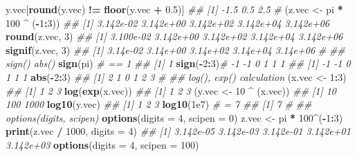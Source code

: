 \documentclass[
]{book}
\newenvironment{Shaded}{\begin{snugshade}}{\end{snugshade}}
\newcommand{\CommentTok}[1]{\textcolor[rgb]{0.56,0.35,0.01}{\textit{#1}}}
\newcommand{\DataTypeTok}[1]{\textcolor[rgb]{0.13,0.29,0.53}{#1}}
\newcommand{\DecValTok}[1]{\textcolor[rgb]{0.00,0.00,0.81}{#1}}
\newcommand{\FloatTok}[1]{\textcolor[rgb]{0.00,0.00,0.81}{#1}}
\newcommand{\KeywordTok}[1]{\textcolor[rgb]{0.13,0.29,0.53}{\textbf{#1}}}
\newcommand{\NormalTok}[1]{#1}
\newcommand{\OperatorTok}[1]{\textcolor[rgb]{0.81,0.36,0.00}{\textbf{#1}}}
\newcommand{\StringTok}[1]{\textcolor[rgb]{0.31,0.60,0.02}{#1}}
\begin{document}
\begin{Shaded}
\begin{Highlighting}[]
\NormalTok{y.vec[}\KeywordTok{round}\NormalTok{(y.vec) }\OperatorTok{!=}\StringTok{ }\KeywordTok{floor}\NormalTok{(y.vec }\OperatorTok{+}\StringTok{ }\FloatTok{0.5}\NormalTok{)]}
\CommentTok{\#\# [1] {-}1.5  0.5  2.5}
\CommentTok{\#}
\NormalTok{(z.vec \textless{}{-}}\StringTok{ }\NormalTok{pi }\OperatorTok{*}\StringTok{ }\DecValTok{100} \OperatorTok{\^{}}\StringTok{ }\NormalTok{(}\OperatorTok{{-}}\DecValTok{1}\OperatorTok{:}\DecValTok{3}\NormalTok{))}
\CommentTok{\#\# [1] 3.142e{-}02 3.142e+00 3.142e+02 3.142e+04 3.142e+06}
\KeywordTok{round}\NormalTok{(z.vec, }\DecValTok{3}\NormalTok{)}
\CommentTok{\#\# [1] 3.100e{-}02 3.142e+00 3.142e+02 3.142e+04 3.142e+06}
\KeywordTok{signif}\NormalTok{(z.vec, }\DecValTok{3}\NormalTok{)}
\CommentTok{\#\# [1] 3.14e{-}02 3.14e+00 3.14e+02 3.14e+04 3.14e+06}
\CommentTok{\#}
\CommentTok{\#\# sign() abs()}
\KeywordTok{sign}\NormalTok{(pi) }\CommentTok{\# == 1}
\CommentTok{\#\# [1] 1}
\KeywordTok{sign}\NormalTok{(}\OperatorTok{{-}}\DecValTok{2}\OperatorTok{:}\DecValTok{3}\NormalTok{)}\CommentTok{\# {-}1 {-}1 0 1 1 1}
\CommentTok{\#\# [1] {-}1 {-}1  0  1  1  1}
\KeywordTok{abs}\NormalTok{(}\OperatorTok{{-}}\DecValTok{2}\OperatorTok{:}\DecValTok{3}\NormalTok{)}
\CommentTok{\#\# [1] 2 1 0 1 2 3}
\CommentTok{\#}
\CommentTok{\#\# log(), exp() calculation}
\NormalTok{(x.vec \textless{}{-}}\StringTok{ }\DecValTok{1}\OperatorTok{:}\DecValTok{3}\NormalTok{)}
\CommentTok{\#\# [1] 1 2 3}
\KeywordTok{log}\NormalTok{(}\KeywordTok{exp}\NormalTok{(x.vec))}
\CommentTok{\#\# [1] 1 2 3}
\NormalTok{(y.vec \textless{}{-}}\StringTok{ }\DecValTok{10} \OperatorTok{\^{}}\StringTok{ }\NormalTok{(x.vec))}
\CommentTok{\#\# [1]   10  100 1000}
\KeywordTok{log10}\NormalTok{(y.vec)}
\CommentTok{\#\# [1] 1 2 3}
\KeywordTok{log10}\NormalTok{(}\FloatTok{1e7}\NormalTok{) }\CommentTok{\# = 7}
\CommentTok{\#\# [1] 7}
\CommentTok{\#}
\CommentTok{\#\# options(digits, scipen)}
\KeywordTok{options}\NormalTok{(}\DataTypeTok{digits =} \DecValTok{4}\NormalTok{, }\DataTypeTok{scipen =} \DecValTok{0}\NormalTok{)}
\NormalTok{z.vec \textless{}{-}}\StringTok{ }\NormalTok{pi }\OperatorTok{*}\StringTok{ }\DecValTok{100}\OperatorTok{\^{}}\NormalTok{(}\OperatorTok{{-}}\DecValTok{1}\OperatorTok{:}\DecValTok{3}\NormalTok{)}
\KeywordTok{print}\NormalTok{(z.vec }\OperatorTok{/}\StringTok{ }\DecValTok{1000}\NormalTok{, }\DataTypeTok{digits =} \DecValTok{4}\NormalTok{)}
\CommentTok{\#\# [1] 3.142e{-}05 3.142e{-}03 3.142e{-}01 3.142e+01 3.142e+03}
\KeywordTok{options}\NormalTok{(}\DataTypeTok{digits =} \DecValTok{4}\NormalTok{, }\DataTypeTok{scipen =} \DecValTok{100}\NormalTok{)}

\end{Highlighting}
\end{Shaded}
\end{document}
